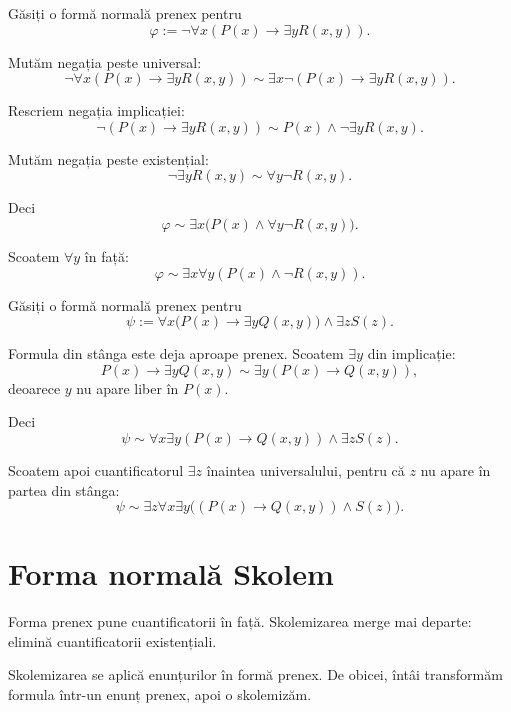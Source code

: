 \begin{ex}
	Găsiți o formă normală prenex pentru
	\[
		\varphi := \neg\forall x(P(x)\to \exists yR(x,y)).
	\]
\end{ex}

\begin{solutie}
	Mutăm negația peste universal:
	\[
		\neg\forall x(P(x)\to \exists yR(x,y))
		\sim
		\exists x\neg(P(x)\to \exists yR(x,y)).
	\]

	Rescriem negația implicației:
	\[
		\neg(P(x)\to \exists yR(x,y))
		\sim
		P(x)\land \neg\exists yR(x,y).
	\]

	Mutăm negația peste existențial:
	\[
		\neg\exists yR(x,y)\sim \forall y\neg R(x,y).
	\]

	Deci
	\[
		\varphi \sim \exists x\big(P(x)\land \forall y\neg R(x,y)\big).
	\]

	Scoatem \( \forall y \) în față:
	\[
		\varphi \sim \exists x\forall y(P(x)\land \neg R(x,y)).
	\]
\end{solutie}

\begin{ex}
	Găsiți o formă normală prenex pentru
	\[
		\psi := \forall x\big(P(x)\to \exists yQ(x,y)\big) \land \exists zS(z).
	\]
\end{ex}

\begin{solutie}
	Formula din stânga este deja aproape prenex. Scoatem \( \exists y \) din implicație:
	\[
		P(x)\to \exists yQ(x,y)
		\sim
		\exists y(P(x)\to Q(x,y)),
	\]
	deoarece \(y\) nu apare liber în \(P(x)\).

	Deci
	\[
		\psi \sim \forall x\exists y(P(x)\to Q(x,y)) \land \exists zS(z).
	\]

	Scoatem apoi cuantificatorul \( \exists z \) înaintea universalului, pentru că \(z\) nu apare în partea din stânga:
	\[
		\psi \sim \exists z\forall x\exists y\big((P(x)\to Q(x,y)) \land S(z)\big).
	\]
\end{solutie}

\section{Forma normală Skolem}

Forma prenex pune cuantificatorii în față. Skolemizarea merge mai departe: elimină cuantificatorii existențiali.

\begin{note}
	Skolemizarea se aplică enunțurilor în formă prenex. De obicei, întâi transformăm formula într-un enunț prenex, apoi o skolemizăm.
\end{note}

